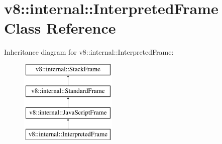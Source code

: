 \hypertarget{classv8_1_1internal_1_1InterpretedFrame}{}\section{v8\+:\+:internal\+:\+:Interpreted\+Frame Class Reference}
\label{classv8_1_1internal_1_1InterpretedFrame}
Inheritance diagram for v8\+:\+:internal\+:\+:Interpreted\+Frame\+:\begin{figure}[H]
\begin{center}
\leavevmode
\includegraphics[height=4.000000cm]{classv8_1_1internal_1_1InterpretedFrame}
\end{center}
\end{figure}
